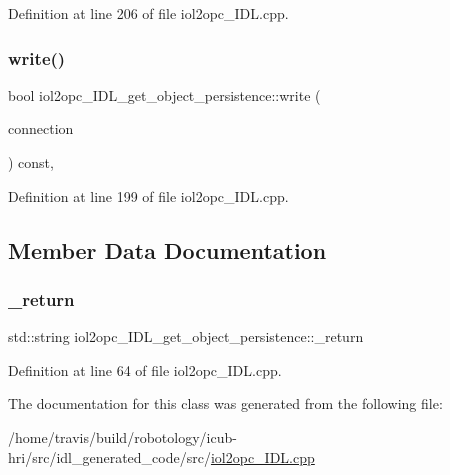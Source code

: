 Definition at line 206 of file iol2opc\+\_\+\+I\+D\+L.\+cpp.

\mbox{\label{classiol2opc__IDL__get__object__persistence_a72b9fff1b3d9a01ec83d979b4080a71b}} 
\subsubsection{\texorpdfstring{write()}{write()}}
{\footnotesize\ttfamily bool iol2opc\+\_\+\+I\+D\+L\+\_\+get\+\_\+object\+\_\+persistence\+::write (\begin{DoxyParamCaption}\item[{yarp\+::os\+::\+Connection\+Writer \&}]{connection }\end{DoxyParamCaption}) const\hspace{0.3cm}{\ttfamily [override]}, {\ttfamily [virtual]}}



Definition at line 199 of file iol2opc\+\_\+\+I\+D\+L.\+cpp.



\subsection{Member Data Documentation}
\mbox{\label{classiol2opc__IDL__get__object__persistence_a5d58210682766024c57668203d8a6270}} 
\subsubsection{\texorpdfstring{\+\_\+return}{\_return}}
{\footnotesize\ttfamily std\+::string iol2opc\+\_\+\+I\+D\+L\+\_\+get\+\_\+object\+\_\+persistence\+::\+\_\+return}



Definition at line 64 of file iol2opc\+\_\+\+I\+D\+L.\+cpp.



The documentation for this class was generated from the following file\+:\begin{DoxyCompactItemize}
\item 
/home/travis/build/robotology/icub-\/hri/src/idl\+\_\+generated\+\_\+code/src/\hyperlink{iol2opc__IDL_8cpp}{iol2opc\+\_\+\+I\+D\+L.\+cpp}\end{DoxyCompactItemize}
